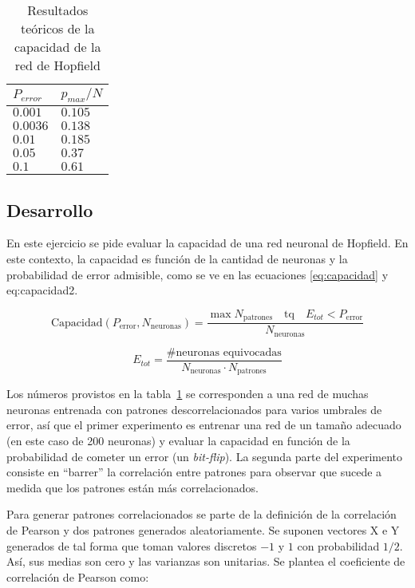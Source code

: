\documentclass[11pt]{article} %
\begin{document}
\begin{table}[h!]
\centering
\begin{tabular}{|l|l|}
\hline
$P_{error}$ & $p_{max}/N$ \\ \hline
$0.001$     & $0.105$     \\ \hline
$0.0036$    & $0.138$     \\ \hline
$0.01$      & $0.185$     \\ \hline
$0.05$      & $0.37$      \\ \hline
$0.1$       & $0.61$      \\ \hline
\end{tabular}
\caption{Resultados teóricos de la capacidad de la red de Hopfield}
\label{tab:1}
\end{table}


\subsection{Desarrollo}

En este ejercicio se pide evaluar la capacidad de una red neuronal de Hopfield. En este contexto, la capacidad es función de la cantidad de neuronas y la probabilidad de error admisible, como se ve en las ecuaciones \eqref{eq:capacidad} y {eq:capacidad2}. 

\begin{equation}
\text{Capacidad}(P_{\text{error}} , N_{\text{neuronas}}) = \frac{\max N_{\text{patrones}} \quad \text{tq} \quad E_{tot}<P_{\text{error}}}{N_{\text{neuronas}}}
\label{eq:capacidad}
\end{equation}

\begin{equation}
E_{tot} = \frac{\text{\# neuronas equivocadas}}{N_{\text{neuronas}} \cdot N_{\text{patrones}}}
\label{eq:capacidad2}
\end{equation}

Los números provistos en la  tabla~\ref{tab:1} se corresponden a una red de muchas neuronas entrenada con patrones descorrelacionados para varios umbrales de error, así que el primer experimento es entrenar una red de un tamaño adecuado (en este caso de 200 neuronas) y evaluar la capacidad en función de la probabilidad de cometer un error (un \textit{bit-flip}). La segunda parte del experimento consiste en ``barrer'' la correlación entre patrones para observar que sucede a medida que los patrones están más correlacionados. 

Para generar patrones correlacionados se parte de la definición de la correlación de Pearson y dos patrones generados aleatoriamente. Se suponen vectores X e Y generados de tal forma que toman valores discretos $-1$ y $1$ con probabilidad $1/2$. Así, sus medias son cero y las varianzas son unitarias. Se plantea el coeficiente de correlación de Pearson como:
\end{document}
